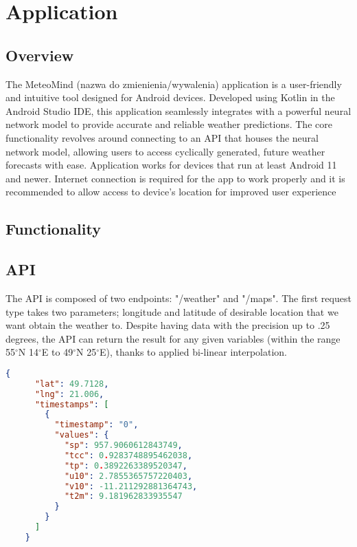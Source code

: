 \chapter{Application}

\section{Overview}
The MeteoMind (nazwa do zmienienia/wywalenia) application is a user-friendly and intuitive tool designed for Android devices. Developed using Kotlin in the Android Studio IDE, this application seamlessly integrates with a powerful neural network model to provide accurate and reliable weather predictions. The core functionality revolves around connecting to an API that houses the neural network model, allowing users to access cyclically generated, future weather forecasts with ease. Application works for devices that run at least Android 11 and newer. Internet connection is required for the app to work properly and it is recommended to allow access to device's location for improved user experience

\section{Functionality}



\section{API}

The API is composed of two endpoints: "/weather" and "/maps". The first request type takes two parameters; longitude and latitude of desirable location that we want obtain the weather to. Despite having data with the precision up to .25 degrees, the API can return the result for any given variables (within the range 55$^{\circ}$N 14$^{\circ}$E to 49$^{\circ}$N 25$^{\circ}$E), thanks to applied bi-linear interpolation. 

    \begin{lstlisting}[language=json, caption={Example of returned JSON with one timestamp}]
    {
      "lat": 49.7128,
      "lng": 21.006,
      "timestamps": [
        {
          "timestamp": "0",
          "values": {
            "sp": 957.9060612843749,
            "tcc": 0.9283748895462038,
            "tp": 0.3892263389520347,
            "u10": 2.7855365757220403,
            "v10": -11.211292881364743,
            "t2m": 9.181962833935547
          }
        }
      ]
    }
    \end{lstlisting}

